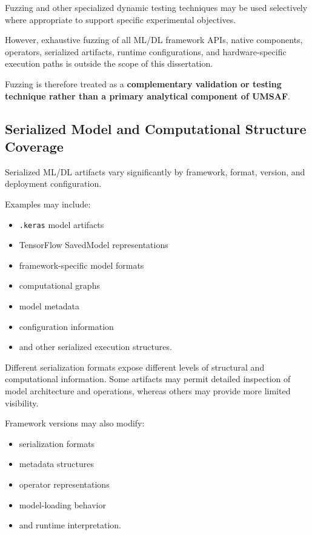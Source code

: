\documentclass[
  12pt,
  letterpaper,
  oneside]{report}
\providecommand{\tightlist}{%
  \setlength{\itemsep}{0pt}\setlength{\parskip}{0pt}}
\begin{document}
Fuzzing and other specialized dynamic testing techniques may be used
selectively where appropriate to support specific experimental
objectives.

However, exhaustive fuzzing of all ML/DL framework APIs, native
components, operators, serialized artifacts, runtime configurations, and
hardware-specific execution paths is outside the scope of this
dissertation.

Fuzzing is therefore treated as a \textbf{complementary validation or
testing technique rather than a primary analytical component of UMSAF}.

\subsection{Serialized Model and Computational Structure Coverage}\label{1316-serialized-model-and-computational-structure-coverage}

Serialized ML/DL artifacts vary significantly by framework, format,
version, and deployment configuration.

Examples may include:

\begin{itemize}
\tightlist
\item
  \texttt{.keras} model artifacts
\item
  TensorFlow SavedModel representations
\item
  framework-specific model formats
\item
  computational graphs
\item
  model metadata
\item
  configuration information
\item
  and other serialized execution structures.
\end{itemize}

Different serialization formats expose different levels of structural
and computational information. Some artifacts may permit detailed
inspection of model architecture and operations, whereas others may
provide more limited visibility.

Framework versions may also modify:

\begin{itemize}
\tightlist
\item
  serialization formats
\item
  metadata structures
\item
  operator representations
\item
  model-loading behavior
\item
  and runtime interpretation.
\end{itemize}
\end{document}
